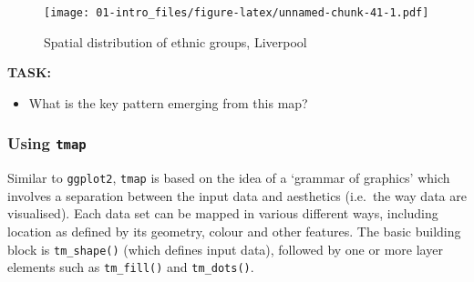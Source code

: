 \documentclass[]{book}
\providecommand{\tightlist}{%
  \setlength{\itemsep}{0pt}\setlength{\parskip}{0pt}}
\begin{document}
\begin{figure}
\centering
\texttt{[image: 01-intro\_files/figure-latex/unnamed-chunk-41-1.pdf]}
\caption{\label{fig:unnamed-chunk-41}Spatial distribution of ethnic groups, Liverpool}
\end{figure}

\textbf{TASK:}

\begin{itemize}
\tightlist
\item
  What is the key pattern emerging from this map?
\end{itemize}

\hypertarget{using-tmap}{%
\subsubsection{\texorpdfstring{Using \texttt{tmap}}{Using tmap}}\label{using-tmap}}

Similar to \texttt{ggplot2}, \texttt{tmap} is based on the idea of a `grammar of graphics' which involves a separation between the input data and aesthetics (i.e.~the way data are visualised). Each data set can be mapped in various different ways, including location as defined by its geometry, colour and other features. The basic building block is \texttt{tm\_shape()} (which defines input data), followed by one or more layer elements such as \texttt{tm\_fill()} and \texttt{tm\_dots()}.
\end{document}
